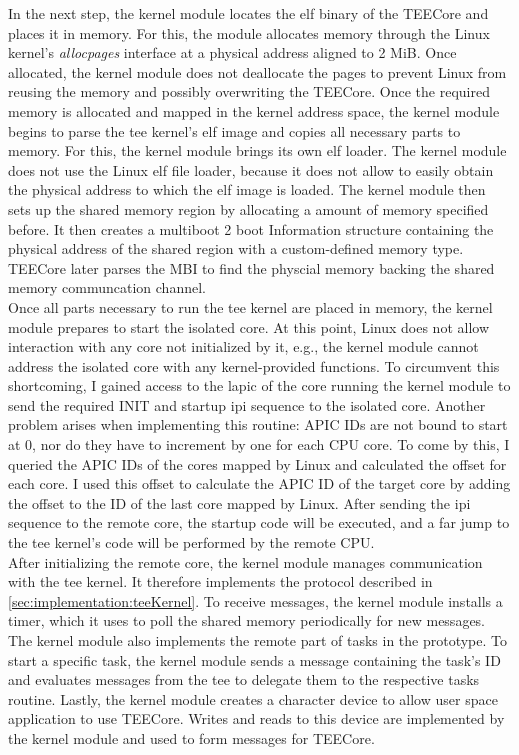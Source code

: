 In the next step, the kernel module locates the \gls{elf} binary of the TEECore
and places it in memory. For this, the module allocates memory through the Linux
kernel's \textit{allocpages} interface at a physical address aligned to 2 MiB.
Once allocated, the kernel module does not deallocate the pages to prevent Linux
from reusing the memory and possibly overwriting the TEECore. Once the required
memory is allocated and mapped in the kernel address space, the kernel module
begins to parse the \gls{tee} kernel's \gls{elf} image and copies all necessary
parts to memory. For this, the kernel module brings its own \gls{elf} loader.
The kernel module does not use the Linux \gls{elf} file loader, because it does
not allow to easily obtain the physical address to which the \gls{elf} image is
loaded. The kernel module then sets up the shared memory region by allocating a
amount of memory specified before. It then creates a multiboot 2 boot
Information structure containing the physical address of the shared region with
a custom-defined memory type. TEECore later parses the MBI to find the physcial
memory backing the shared memory communcation channel.\\

Once all parts necessary to run the \gls{tee} kernel are placed in memory, the
kernel module prepares to start the isolated core. At this point, Linux does not
allow interaction with any core not initialized by it, e.g., the kernel module
cannot address the isolated core with any kernel-provided functions. To
circumvent this shortcoming, I gained access to the \gls{lapic} of the core
running the kernel module to send the required INIT and startup \gls{ipi}
sequence to the isolated core. Another problem arises when implementing this
routine: APIC IDs are not bound to start at 0, nor do they have to increment by
one for each CPU core. To come by this, I queried the APIC IDs of the cores
mapped by Linux and calculated the offset for each core. I used this offset to
calculate the APIC ID of the target core by adding the offset to the ID of the
last core mapped by Linux. After sending the \gls{ipi} sequence to the remote
core, the startup code will be executed, and a far jump to the \gls{tee}
kernel's code will be performed by the remote CPU.\\

After initializing the remote core, the kernel module manages communication with
the \gls{tee} kernel. It therefore implements the protocol described in
\ref{sec:implementation:teeKernel}. To receive messages, the kernel module
installs a timer, which it uses to poll the shared memory periodically for new
messages. The kernel module also implements the remote part of tasks in the
prototype. To start a specific task, the kernel module sends a message
containing the task's ID and evaluates messages from the \gls{tee} to delegate
them to the respective tasks routine. Lastly, the kernel module creates a
character device to allow user space application to use TEECore. Writes and
reads to this device are implemented by the kernel module and used to form
messages for TEECore.

